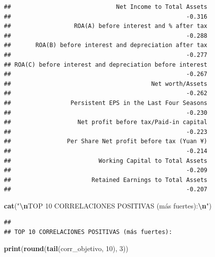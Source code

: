 \documentclass[
]{book}
\newenvironment{Shaded}{\begin{snugshade}}{\end{snugshade}}
\newcommand{\DecValTok}[1]{\textcolor[rgb]{0.00,0.00,0.81}{#1}}
\newcommand{\FunctionTok}[1]{\textcolor[rgb]{0.13,0.29,0.53}{\textbf{#1}}}
\newcommand{\NormalTok}[1]{#1}
\newcommand{\SpecialCharTok}[1]{\textcolor[rgb]{0.81,0.36,0.00}{\textbf{#1}}}
\newcommand{\StringTok}[1]{\textcolor[rgb]{0.31,0.60,0.02}{#1}}
\begin{document}
\begin{verbatim}
##                              Net Income to Total Assets 
##                                                  -0.316 
##                  ROA(A) before interest and % after tax 
##                                                  -0.288 
##       ROA(B) before interest and depreciation after tax 
##                                                  -0.277 
## ROA(C) before interest and depreciation before interest 
##                                                  -0.267 
##                                        Net worth/Assets 
##                                                  -0.262 
##                 Persistent EPS in the Last Four Seasons 
##                                                  -0.230 
##                   Net profit before tax/Paid-in capital 
##                                                  -0.223 
##                Per Share Net profit before tax (Yuan ¥) 
##                                                  -0.214 
##                         Working Capital to Total Assets 
##                                                  -0.209 
##                       Retained Earnings to Total Assets 
##                                                  -0.207
\end{verbatim}

\begin{Shaded}
\begin{Highlighting}[]
\FunctionTok{cat}\NormalTok{(}\StringTok{"}\SpecialCharTok{\textbackslash{}n}\StringTok{TOP 10 CORRELACIONES POSITIVAS (más fuertes):}\SpecialCharTok{\textbackslash{}n}\StringTok{"}\NormalTok{)}
\end{Highlighting}
\end{Shaded}

\begin{verbatim}
## 
## TOP 10 CORRELACIONES POSITIVAS (más fuertes):
\end{verbatim}

\begin{Shaded}
\begin{Highlighting}[]
\FunctionTok{print}\NormalTok{(}\FunctionTok{round}\NormalTok{(}\FunctionTok{tail}\NormalTok{(corr\_objetivo, }\DecValTok{10}\NormalTok{), }\DecValTok{3}\NormalTok{))}
\end{Highlighting}
\end{Shaded}
\end{document}
